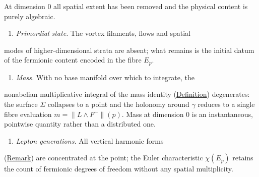 \begin{remark}
  \label{rem:descent-physical-zero}
At dimension 0 all spatial extent has been removed and the physical
content is purely algebraic.

\begin{enumerate}
  \item \emph{Primordial state.}  The vortex filaments, flows and spatial
\end{enumerate}
   modes of higher-dimensional strata are absent; what remains is
   the initial datum of the fermionic content encoded in the
   fibre $E_p$.
\begin{enumerate}
  \item \emph{Mass.}  With no base manifold over which to integrate, the
\end{enumerate}
   nonabelian multiplicative integral of the mass identity
   (\hyperref[def:mass-identity]{Definition}) degenerates: the surface
   $\Sigma$ collapses to a point and the holonomy around $\gamma$
   reduces to a single fibre evaluation
   $m = \lVert L \wedge F^+\rVert(p)$.
   Mass at dimension 0 is an instantaneous, pointwise quantity
   rather than a distributed one.
\begin{enumerate}
  \item \emph{Lepton generations.}  All vertical harmonic forms
\end{enumerate}
   (\hyperref[rem:betti-numbers-brane]{Remark}) are concentrated at the
   point; the Euler characteristic $\chi(E_p)$ retains the count of
   fermionic degrees of freedom without any spatial multiplicity.
\end{remark}

